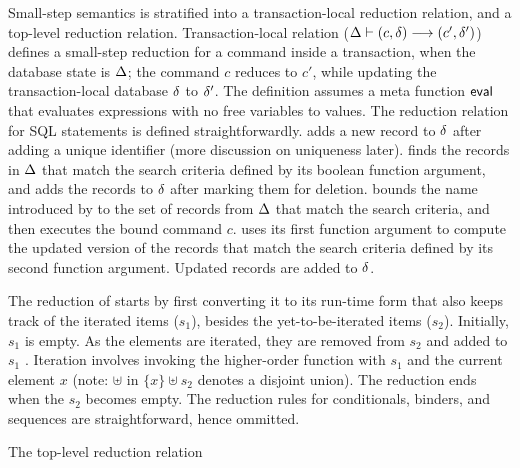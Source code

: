 Small-step semantics is stratified into a transaction-local reduction
relation, and a top-level reduction relation. Transaction-local
relation ($\Delta \vdash (c,\delta) \longrightarrow (c',\delta')$) defines a
small-step reduction for a command inside a transaction, when the
database state is $\Delta$; the command $c$ reduces to $c'$, while
updating the transaction-local database $\delta$ to $\delta'$. The
definition assumes a meta function $\textsf{eval}$ that evaluates expressions
with no free variables to values. The reduction relation for SQL
statements is defined straightforwardly.   adds a new record
to $\delta$ after adding a unique identifier (more discussion on
uniqueness later).  finds the records in $\Delta$ that match
the search criteria defined by its boolean function argument, and adds
the records to $\delta$ after marking them for deletion. 
bounds the name introduced by  to the set of records from
$\Delta$ that match the search criteria, and then executes the bound
command $c$.  uses its first function argument to compute
the updated version of the records that match the search criteria
defined by its second function argument. Updated records are added to
$\delta$. 

The reduction of  starts by first converting it to its
run-time form that also keeps track of the iterated items ($s_1$),
besides the yet-to-be-iterated items ($s_2$). Initially, $s_1$ is
empty. As the elements are iterated, they are removed from $s_2$ and
added to $s_1$ . Iteration involves invoking the higher-order function
with $s_1$ and the current element $x$ (note: $\uplus$ in $\{x\}
\uplus s_2$ denotes a disjoint union). The reduction ends when the
$s_2$ becomes empty. The reduction rules for conditionals, 
binders, and sequences are straightforward, hence ommitted.

The top-level reduction relation


